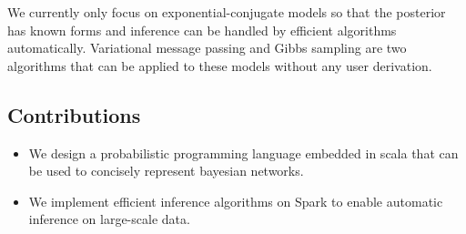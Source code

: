 We currently only focus on exponential-conjugate models so that the posterior
has known forms and inference can be handled by efficient algorithms
automatically. Variational message passing and Gibbs sampling are two
algorithms that can be applied to these models without any user derivation.

\subsection{Contributions}

\begin{itemize}
	\item We design a probabilistic programming language embedded in scala
		that can be used to concisely represent bayesian networks.
	\item We implement efficient inference algorithms on Spark to enable
		automatic inference on large-scale data.
\end{itemize}

